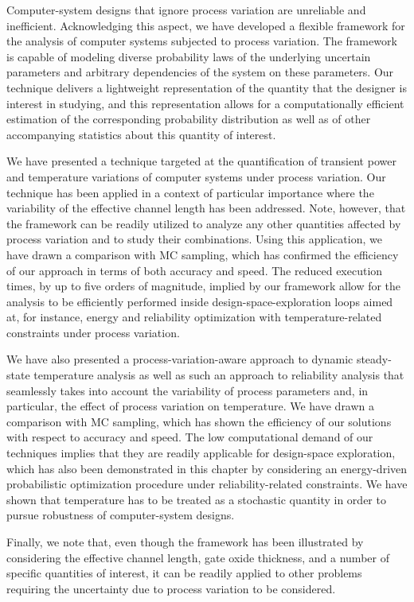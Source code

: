Computer-system designs that ignore process variation are unreliable and
inefficient. Acknowledging this aspect, we have developed a flexible framework
for the analysis of computer systems subjected to process variation. The
framework is capable of modeling diverse probability laws of the underlying
uncertain parameters and arbitrary dependencies of the system on these
parameters. Our technique delivers a lightweight representation of the quantity
that the designer is interest in studying, and this representation allows for a
computationally efficient estimation of the corresponding probability
distribution as well as of other accompanying statistics about this quantity of
interest.

We have presented a technique targeted at the quantification of transient power
and temperature variations of computer systems under process variation. Our
technique has been applied in a context of particular importance where the
variability of the effective channel length has been addressed. Note, however,
that the framework can be readily utilized to analyze any other quantities
affected by process variation and to study their combinations. Using this
application, we have drawn a comparison with \ac{MC} sampling, which has
confirmed the efficiency of our approach in terms of both accuracy and speed.
The reduced execution times, by up to five orders of magnitude, implied by our
framework allow for the analysis to be efficiently performed inside
design-space-exploration loops aimed at, for instance, energy and reliability
optimization with temperature-related constraints under process variation.

We have also presented a process-variation-aware approach to dynamic
steady-state temperature analysis as well as such an approach to reliability
analysis that seamlessly takes into account the variability of process
parameters and, in particular, the effect of process variation on temperature.
We have drawn a comparison with \ac{MC} sampling, which has shown the efficiency
of our solutions with respect to accuracy and speed. The low computational
demand of our techniques implies that they are readily applicable for
design-space exploration, which has also been demonstrated in this chapter by
considering an energy-driven probabilistic optimization procedure under
reliability-related constraints. We have shown that temperature has to be
treated as a stochastic quantity in order to pursue robustness of
computer-system designs.

Finally, we note that, even though the framework has been illustrated by
considering the effective channel length, gate oxide thickness, and a number of
specific quantities of interest, it can be readily applied to other problems
requiring the uncertainty due to process variation to be considered.
